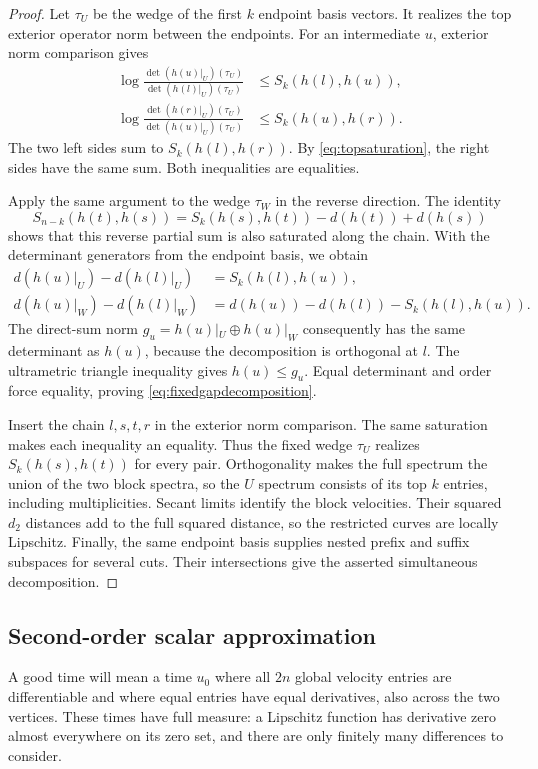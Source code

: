 \begin{proof}
Let $\tau_U$ be the wedge of the first $k$ endpoint basis vectors.
It realizes the top exterior operator norm between the endpoints.
For an intermediate $u$, exterior norm comparison gives
\[
 \begin{split}
 \log\frac{\det(h(u)|_U)(\tau_U)}{\det(h(l)|_U)(\tau_U)}
      &\le S_k(h(l),h(u)),\\
 \log\frac{\det(h(r)|_U)(\tau_U)}{\det(h(u)|_U)(\tau_U)}
      &\le S_k(h(u),h(r)).
 \end{split}
\]
The two left sides sum to $S_k(h(l),h(r))$. By
\eqref{eq:topsaturation}, the right sides have the same sum.
Both inequalities are equalities.

Apply the same argument to the wedge $\tau_W$ in the reverse
direction. The identity
\[
 S_{n-k}(h(t),h(s))
   =S_k(h(s),h(t))-d(h(t))+d(h(s))
\]
shows that this reverse partial sum is also saturated along the
chain. With the determinant generators from the endpoint basis,
we obtain
\[
 \begin{split}
 d(h(u)|_U)-d(h(l)|_U)&=S_k(h(l),h(u)),\\
 d(h(u)|_W)-d(h(l)|_W)&=d(h(u))-d(h(l))-S_k(h(l),h(u)).
 \end{split}
\]
The direct-sum norm $g_u=h(u)|_U\oplus h(u)|_W$ consequently has
the same determinant as $h(u)$, because the decomposition is
orthogonal at $l$. The ultrametric triangle inequality gives
$h(u)\le g_u$. Equal determinant and order force equality, proving
\eqref{eq:fixedgapdecomposition}.

Insert the chain $l,s,t,r$ in the exterior norm comparison. The
same saturation makes each inequality an equality. Thus the fixed
wedge $\tau_U$ realizes $S_k(h(s),h(t))$ for every pair.
Orthogonality makes the full spectrum the union of the two block
spectra, so the $U$ spectrum consists of its top $k$ entries,
including multiplicities. Secant limits identify the block
velocities. Their squared $d_2$ distances add to the full squared
distance, so the restricted curves are locally Lipschitz.
Finally, the same endpoint basis supplies nested prefix and suffix
subspaces for several cuts. Their intersections give the asserted
simultaneous decomposition.
\end{proof}

\subsection{Second-order scalar approximation}
A good time will mean a time $u_0$ where all $2n$ global velocity
entries are differentiable and where equal entries have equal
derivatives, also across the two vertices. These times have full
measure: a Lipschitz function has derivative zero almost everywhere
on its zero set, and there are only finitely many differences to
consider.

